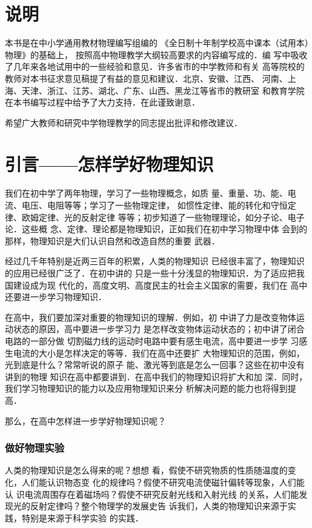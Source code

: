 \chapter{说明}

本书是在中小学通用教材物理编写组编的
《全日制十年制学校高中课本（试用本）物理》的基础上，
按照高中物理教学大纲较高要求的内容编写成的．编
写中吸收了几年来各地试用中的一些经验和意见．许多省市的中学教师和有关
高等院校的教师对本书征求意见稿提了有益的意见和建议．北京、安徽、江西、
河南、上海、天津、浙江、江苏、湖北、广东、山西、黑龙江等省市的教研室
和教育学院在本书编写过程中给予了大力支持．在此谨致谢意．

希望广大教师和研究中学物理教学的同志提出批评和修改建议．


\chapter{引言——怎样学好物理知识}

我们在初中学了两年物理，学习了一些物理概念，如质
量、重量、功、能、电流、电压、电阻等等；学习了一些物理定律，
如惯性定律、能的转化和守恒定律、欧姆定律、光的反射定律
等等；初步知道了一些物理理论，如分子论、电子论．这些概
念、定律、理论都是物理知识，正如我们在初中学习物理中体
会到的那样，物理知识是大们认识自然和改造自然的重要
武器．

经过几千年特别是近两三百年的积累，人类的物理知识
已经很丰富了，物理知识的应用已经很广泛了．在初中讲的
只是一些十分浅显的物理知识．为了适应把我国建设成为现
代化的，高度文明、高度民主的社会主义国家的需要，我们在
高中还要进一步学习物理知识．

    在高中，我们要加深对重要的物理知识的理解．例如，初
中讲了力是改变物体运动状态的原因，高中要进一步学习力
是怎样改变物体运动状态的；初中讲了闭合电路的一部分做
切割磁力线的运动时电路中要有感生电流，高中要进一步学
习感生电流的大小是怎样决定的等等．我们在高中还要扩
大物理知识的范围，例如，光到底是什么？常常听说的原子
能、激光等到底是怎么一回事？这些在初中没有讲到的物理
知识在高中都要讲到．在高中我们的物理知识将扩大和加
深．同时，我们学习物理知识的能力以及应用物理知识来分
析解决问题的能力也将得到提高．

    那么，在高中怎样进一步学好物理知识呢？

\subsection*{做好物理实验}
人类的物理知识是怎么得来的呢？想想
看，假使不研究物质的性质随温度的变化，人们能认识物态变
化的规律吗？假使不研究电流使磁针偏转等现象，人们能认
识电流周围存在着磁场吗？假使不研究反射光线和入射光线
的关系，人们能发现光的反射定律吗？整个物理学的发展史告
诉我们，人类的物理知识来源于实践，特别是来源于科学实验
的实践．

